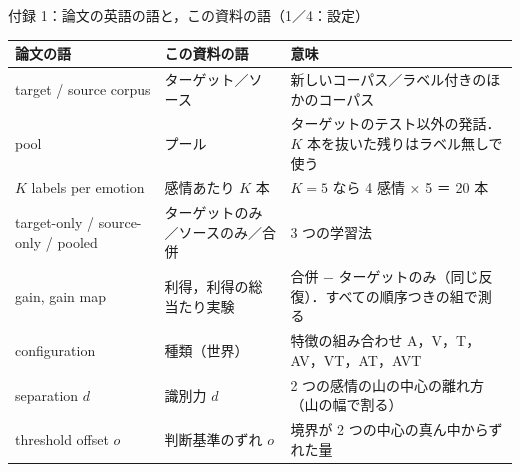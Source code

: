 
\begin{frame}{付録 1：論文の英語の語と，この資料の語（1／4：設定）}
  \label{a:terms}
  \vspace{-0.2em}
  \centering\scriptsize
  \renewcommand{\arraystretch}{1.12}
  \begin{tabularx}{\textwidth}{@{}l l X@{}}
    \toprule
    論文の語 & この資料の語 & 意味 \\
    \midrule
    target / source corpus & ターゲット／ソース & 新しいコーパス／ラベル付きのほかのコーパス \\
    pool & プール & ターゲットのテスト以外の発話．$K$ 本を抜いた残りはラベル無しで使う \\
    $K$ labels per emotion & 感情あたり $K$ 本 & $K=5$ なら 4 感情 × 5 ＝ 20 本 \\
    target-only / source-only / pooled & ターゲットのみ／ソースのみ／合併 & 3 つの学習法 \\
    gain, gain map & 利得，利得の総当たり実験 & 合併 − ターゲットのみ（同じ反復）．すべての順序つきの組で測る \\
    configuration & 種類（世界） & 特徴の組み合わせ A，V，T，AV，VT，AT，AVT \\
    separation $d$ & 識別力 $d$ & 2 つの感情の山の中心の離れ方（山の幅で割る） \\
    threshold offset $o$ & 判断基準のずれ $o$ & 境界が 2 つの中心の真ん中からずれた量 \\
    \bottomrule
  \end{tabularx}
\end{frame}

